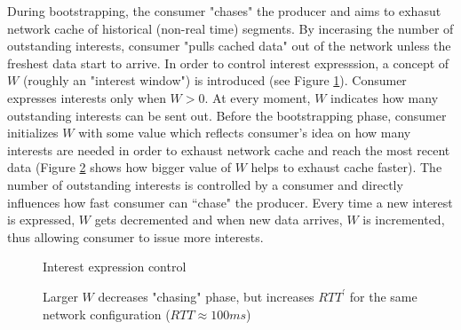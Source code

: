 \documentclass[10pt]{icn/sig-alternate-10pt} %
\begin{document}
During bootstrapping, the consumer "chases" the producer and aims to exhasut network cache of historical (non-real time) segments. By incerasing the number of outstanding interests, consumer "pulls cached data" out of the network unless the freshest data start to arrive. In order to control interest expresssion, a concept of $W$ (roughly an "interest window") is introduced (see Figure \ref{fig:w-concept}). Consumer expresses interests only when $W > 0$. At every moment, $W$ indicates how many outstanding interests can be sent out. Before the bootstrapping phase, consumer initializes $W$ with some value which reflects consumer's idea on how many interests are needed in order to exhaust network cache and reach the most recent data (Figure \ref{fig:ws} shows how bigger value of $W$ helps to exhaust cache faster). The number of outstanding interests is controlled by a consumer and directly influences how fast consumer can ``chase" the producer. Every time a new interest is expressed, $W$ gets decremented and when new data arrives, $W$ is incremented, thus allowing consumer to issue more interests.

\begin{figure}[t!]
\centering


\caption{Interest expression control}
\label{fig:w-concept}
\end{figure}

\begin{figure}[t!]
\centering
\begin{scriptsize}
\end{scriptsize}
\caption{Larger $W$ decreases "chasing" phase, but increases $RTT^\prime$ for the same network configuration ($RTT\approx100ms$)}
\label{fig:ws}
\end{figure}
\end{document}

